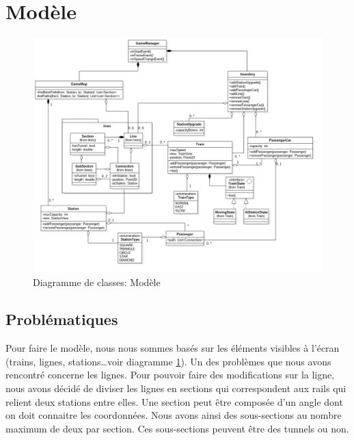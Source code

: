 \documentclass[report, backcover, french, nodocumentinfo]{upmethodology-document}
\begin{document}
		\section{Modèle}
			\begin{figure}[h!]
				\centering
				\includegraphics[width=1\textwidth]{figures/ModelClassDiagram}
				\caption{Diagramme de classes: Modèle}
				\label{fig:ModelClassDiagram}
			\end{figure}
			\subsection{Problématiques}
				\p{}
					Pour faire le modèle, nous nous sommes basés sur les éléments visibles à l'écran (trains, lignes, stations\ldots voir diagramme \ref{fig:ModelClassDiagram}). Un des problèmes que nous avons rencontré concerne les lignes. Pour pouvoir faire des modifications sur la ligne, nous avons décidé de diviser les lignes en sections qui correspondent aux rails qui relient deux stations entre elles. Une section peut être composée d'un angle dont on doit connaitre les coordonnées. Nous avons ainsi des sous-sections au nombre maximum de deux par section. Ces sous-sections peuvent être des tunnels ou non.
\end{document}
